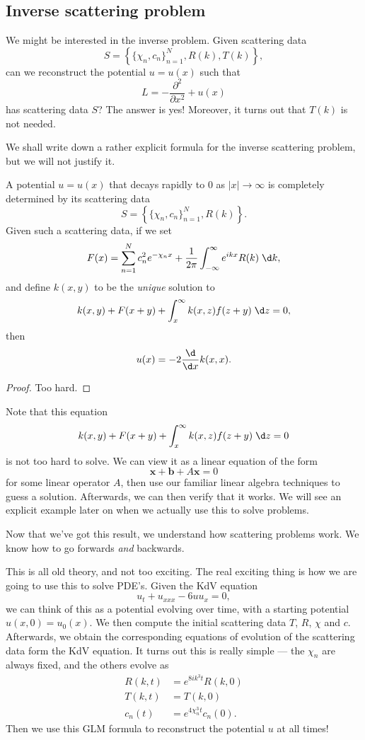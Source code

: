 \documentclass[a4paper]{article}
\begin{document}
\subsection{Inverse scattering problem}
We might be interested in the inverse problem. Given scattering data
\[
  S = \left\{\{\chi_n, c_n\}_{n = 1}^N, R(k), T(k)\right\},
\]
can we reconstruct the potential $u = u(x)$ such that
\[
  L = -\frac{\partial^2}{\partial x^2} + u(x)
\]
has scattering data $S$? The answer is yes! Moreover, it turns out that $T(k)$ is not needed.

We shall write down a rather explicit formula for the inverse scattering problem, but we will not justify it.
\begin{thm}
  A potential $u = u(x)$ that decays rapidly to $0$ as $|x| \to \infty$ is completely determined by its scattering data
  \[
    S = \left\{\{\chi_n, c_n\}_{n = 1}^N, R(k)\right\}.
  \]
  Given such a scattering data, if we set
  \[
    F(x) = \sum_{n = 1}^N c_n^2 e^{-\chi_n x} + \frac{1}{2\pi} \int_{-\infty}^\infty e^{ikx} R(k) \;\d k,
  \]
  and define $k(x, y)$ to be the \emph{unique} solution to
  \[
    k(x, y) + F(x + y) + \int_{x}^\infty k(x, z) f(z + y) \;\d z = 0,
  \]
  then
  \[
    u(x) = -2 \frac{\d}{\d x} k(x, x).
  \]
\end{thm}

\begin{proof}
  Too hard.
\end{proof}
Note that this equation
\[
  k(x, y) + F(x + y) + \int_{x}^\infty k(x, z) f(z + y) \;\d z = 0
\]
is not too hard to solve. We can view it as a linear equation of the form
\[
  \mathbf{x} + \mathbf{b} + A \mathbf{x} = 0
\]
for some linear operator $A$, then use our familiar linear algebra techniques to guess a solution. Afterwards, we can then verify that it works. We will see an explicit example later on when we actually use this to solve problems.

Now that we've got this result, we understand how scattering problems work. We know how to go forwards \emph{and} backwards.

This is all old theory, and not too exciting. The real exciting thing is how we are going to use this to solve PDE's. Given the KdV equation
\[
  u_t + u_{xxx} - 6uu_x = 0,
\]
we can think of this as a potential evolving over time, with a starting potential $u(x, 0) = u_0(x)$. We then compute the initial scattering data $T$, $R$, $\chi$ and $c$. Afterwards, we obtain the corresponding equations of evolution of the scattering data form the KdV equation. It turns out this is really simple --- the $\chi_n$ are always fixed, and the others evolve as
\begin{align*}
  R(k, t) &= e^{8ik^3 t}R(k, 0)\\
  T(k, t) &= T(k, 0)\\
  c_n(t) &=e^{4 \chi_n^3 t} c_n(0).
\end{align*}
Then we use this GLM formula to reconstruct the potential $u$ at all times!
\end{document}
